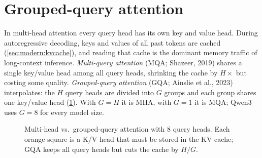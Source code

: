 \section{Grouped-query attention}\label{sec:modern:gqa}

In multi-head attention every query head has its own key and value head. During autoregressive
decoding, keys and values of all past tokens are cached (\cref{sec:modern:kvcache}), and reading that
cache is the dominant memory traffic of long-context inference. \emph{Multi-query attention}
(MQA; Shazeer, 2019) shares a single key/value head among all query heads, shrinking the cache by
$H\times$ but costing some quality. \emph{Grouped-query attention} (GQA; Ainslie et al., 2023)
interpolates: the $H$ query heads are divided into $G$ groups and each group shares one key/value head
(\cref{fig:modern:gqa}). With $G=H$ it is MHA, with $G=1$ it is MQA; Qwen3 uses $G=8$ for every model
size.

\begin{figure}[t]
\centering
{}
\caption{Multi-head vs.\ grouped-query attention with 8 query heads. Each orange square is a K/V head
that must be stored in the KV cache; GQA keeps all query heads but cuts the cache by $H/G$.}
\label{fig:modern:gqa}
\end{figure}

